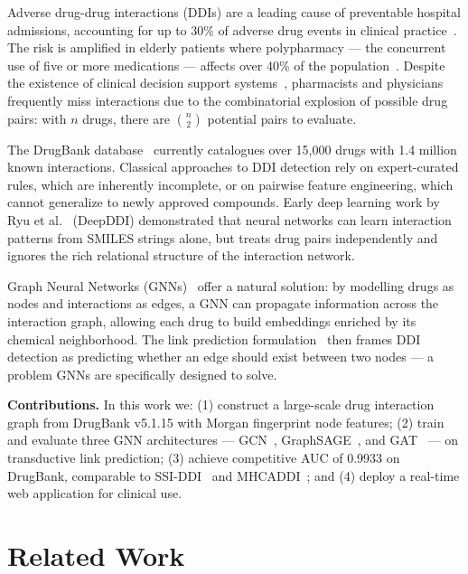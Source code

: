 \documentclass[10pt,twocolumn]{article}
\begin{document}
Adverse drug-drug interactions (DDIs) are a leading cause of preventable hospital
admissions, accounting for up to 30\% of adverse drug events in clinical
practice~\cite{magro2012}. The risk is amplified in elderly patients where
polypharmacy --- the concurrent use of five or more medications --- affects over
40\% of the population~\cite{masnoon2017}. Despite the existence of clinical
decision support systems~\cite{glassman2002}, pharmacists and physicians frequently
miss interactions due to the combinatorial explosion of possible drug pairs: with
$n$ drugs, there are $\binom{n}{2}$ potential pairs to evaluate.

The DrugBank database~\cite{wishart2018} currently catalogues over 15,000 drugs
with 1.4 million known interactions. Classical approaches to DDI detection rely
on expert-curated rules, which are inherently incomplete, or on pairwise feature
engineering, which cannot generalize to newly approved compounds. Early deep
learning work by Ryu et al.~\cite{ryu2018} (DeepDDI) demonstrated that neural
networks can learn interaction patterns from SMILES strings alone, but treats drug
pairs independently and ignores the rich relational structure of the interaction
network.

Graph Neural Networks (GNNs)~\cite{wu2021} offer a natural solution: by modelling
drugs as nodes and interactions as edges, a GNN can propagate information across
the interaction graph, allowing each drug to build embeddings enriched by its
chemical neighborhood. The link prediction formulation~\cite{zhang2018} then frames
DDI detection as predicting whether an edge should exist between two nodes --- a
problem GNNs are specifically designed to solve.

\textbf{Contributions.} In this work we: (1) construct a large-scale drug interaction
graph from DrugBank v5.1.15 with Morgan fingerprint node features; (2) train and
evaluate three GNN architectures --- GCN~\cite{kipf2017}, GraphSAGE~\cite{hamilton2017},
and GAT~\cite{velickovic2018} --- on transductive link prediction; (3) achieve
competitive AUC of 0.9933 on DrugBank, comparable to SSI-DDI~\cite{nyamabo2021} and
MHCADDI~\cite{deac2019}; and (4) deploy a real-time web application for clinical use.

\section{Related Work}
\end{document}

